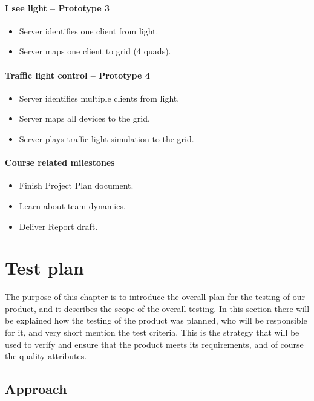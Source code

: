 \paragraph{I see light -- Prototype 3}
\begin{itemize}
	\item Server identifies one client from light.
	\item Server maps one client to grid (4 quads).
\end{itemize}

\paragraph{Traffic light control -- Prototype 4}
\begin{itemize}
	\item Server identifies multiple clients from light.
	\item Server maps all devices to the grid.
	\item Server plays traffic light simulation to the grid.
\end{itemize}

\paragraph{Course related milestones}
\begin{itemize}
	\item Finish Project Plan document.
	\item Learn about team dynamics.
	\item Deliver Report draft.
\end{itemize}

\section{Test plan}
The purpose of this chapter is to introduce the overall plan for the testing of our product, and it describes the scope of the overall testing.
In this section there will be explained how the testing of the product was planned, who will be responsible for it, and very short mention the test criteria.
This is the strategy that will be used to verify and ensure that the product meets its requirements, and of course the quality attributes. 

\subsection{Approach}

